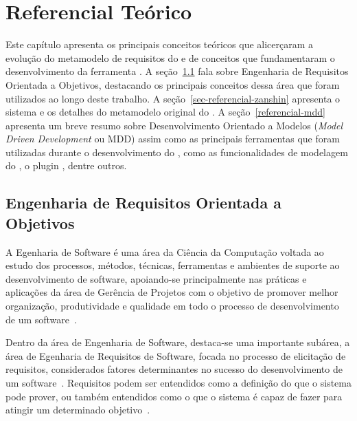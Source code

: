\chapter{Referencial Teórico}
\label{sec-referencial}

Este capítulo apresenta os principais conceitos teóricos que alicerçaram a evolução do metamodelo de requisitos do \zanshin e de conceitos que fundamentaram o desenvolvimento da ferramenta \unagi. A seção~\ref{sec-referencial-engenharia-objetivos} fala sobre Engenharia de Requisitos Orientada a Objetivos, destacando os principais conceitos dessa área que foram utilizados ao longo deste trabalho. A seção~\ref{sec-referencial-zanshin} apresenta o sistema \zanshin e os detalhes do metamodelo original do \framework. A seção~\ref{referencial-mdd} apresenta um breve resumo sobre Desenvolvimento Orientado a Modelos (\textit{Model Driven Development} ou MDD) assim como  as principais ferramentas que foram utilizadas durante o desenvolvimento do \unagi, como as funcionalidades \emf de modelagem do \eclipse, o plugin \sirius, dentre outros.


\section{Engenharia de Requisitos Orientada a Objetivos}
\label{sec-referencial-engenharia-objetivos}

A Egenharia de Software é uma área da Ciência da Computação voltada ao estudo dos processos, métodos, técnicas, ferramentas e ambientes de suporte ao desenvolvimento de software, apoiando-se principalmente nas práticas e aplicações da área de Gerência de Projetos com o objetivo de promover melhor organização, produtividade e qualidade em todo o processo de desenvolvimento de um software~\cite{falboEngSoft}.

Dentro da área de Engenharia de Software, destaca-se uma importante subárea, a área de Egenharia de Requisitos de Software, focada no processo de elicitação de requisitos, considerados fatores determinantes no sucesso do desenvolvimento de um software~\cite{falboEngReq}. Requisitos podem ser entendidos como a definição do que o sistema pode prover, ou também entendidos como o que o sistema é capaz de fazer para atingir um determinado objetivo~\cite{pfleeger2004engenharia}.

